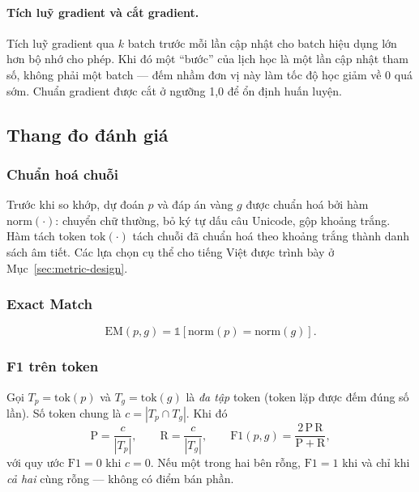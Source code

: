 \paragraph{Tích luỹ gradient và cắt gradient.} Tích luỹ gradient qua $k$ batch trước mỗi
lần cập nhật cho batch hiệu dụng lớn hơn bộ nhớ cho phép. Khi đó một ``bước'' của lịch
học là một lần cập nhật tham số, không phải một batch --- đếm nhầm đơn vị này làm tốc độ
học giảm về 0 quá sớm. Chuẩn gradient được cắt ở ngưỡng 1,0 để ổn định huấn luyện.

\subsection{Thang đo đánh giá}
\label{sec:metrics-theory}

\subsubsection{Chuẩn hoá chuỗi}

Trước khi so khớp, dự đoán $p$ và đáp án vàng $g$ được chuẩn hoá bởi hàm
$\mathrm{norm}(\cdot)$: chuyển chữ thường, bỏ ký tự dấu câu Unicode, gộp khoảng trắng.
Hàm tách token $\mathrm{tok}(\cdot)$ tách chuỗi đã chuẩn hoá theo khoảng trắng thành
danh sách âm tiết. Các lựa chọn cụ thể cho tiếng Việt được trình bày ở
Mục~\ref{sec:metric-design}.

\subsubsection{Exact Match}

\begin{equation}
  \mathrm{EM}(p, g) = \mathbb{1}\left[ \mathrm{norm}(p) = \mathrm{norm}(g) \right].
\end{equation}

\subsubsection{F1 trên token}

Gọi $T_p = \mathrm{tok}(p)$ và $T_g = \mathrm{tok}(g)$ là \emph{đa tập} token (token lặp
được đếm đúng số lần). Số token chung là $c = |T_p \cap T_g|$. Khi đó
\begin{equation}
  \mathrm{P} = \frac{c}{|T_p|}, \qquad
  \mathrm{R} = \frac{c}{|T_g|}, \qquad
  \mathrm{F1}(p, g) = \frac{2\,\mathrm{P}\,\mathrm{R}}{\mathrm{P} + \mathrm{R}} ,
\end{equation}
với quy ước $\mathrm{F1} = 0$ khi $c = 0$. Nếu một trong hai bên rỗng, $\mathrm{F1} = 1$
khi và chỉ khi \emph{cả hai} cùng rỗng --- không có điểm bán phần.

